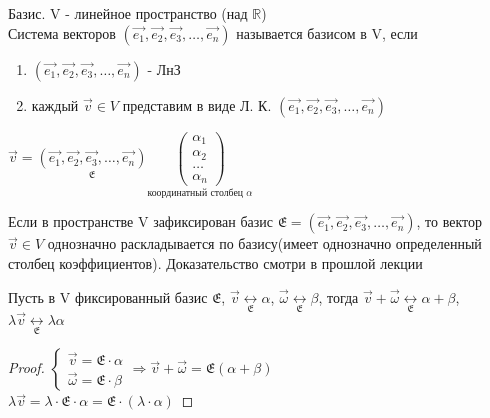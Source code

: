 	\begin{definition}
		Базис. V - линейное пространство (над $\mathbb{R}$) \\
		Система векторов \((\vec{e_1}, \vec{e_2}, \vec{e_3},\ldots, \vec{e_n})\) называется базисом в V, если 
		\begin{enumerate}
			\item \((\vec{e_1}, \vec{e_2}, \vec{e_3},\ldots, \vec{e_n})\) - ЛнЗ
			\item каждый $\vec{v}\in V$ представим в виде Л. К. \((\vec{e_1}, \vec{e_2}, \vec{e_3},\ldots, \vec{e_n})\)
		\end{enumerate}
		\begin{note}
			$\vec{v} = \underset{\mathfrak{E}}{(\vec{e_1}, \vec{e_2}, \vec{e_3},\ldots, \vec{e_n})}\underset{\text{координатный столбец } \alpha}{\begin{pmatrix}
					\alpha_1 \\ \alpha_2 \\ \ldots \\\alpha_n
			\end{pmatrix}} $
		\end{note}
	\end{definition}
	\begin{proposition}
		Если в пространстве V зафиксирован базис $\mathfrak{E} =(\vec{e_1}, \vec{e_2}, \vec{e_3},\ldots, \vec{e_n})$, то вектор $\vec{v}\in V$ однозначно раскладывается по базису(имеет однозначно определенный столбец коэффициентов). Доказательство смотри в прошлой лекции
	\end{proposition}
	\begin{proposition}
		Пусть в V фиксированный базис $\mathfrak{E}$, $\vec{v}\underset{\mathfrak{E}}{\longleftrightarrow}\alpha$, $\vec{\omega}\underset{\mathfrak{E}}{\longleftrightarrow}\beta$, тогда $\vec{v}+\vec{\omega}\underset{\mathfrak{E}}{\longleftrightarrow}\alpha+\beta$, \(\lambda \vec{v}\underset{\mathfrak{E}}{\longleftrightarrow}\lambda \alpha\)
	\end{proposition}
	\begin{proof}
		$\left\{\begin{gathered}
			\vec{v} = \mathfrak{E}\cdot\alpha \\
			\vec{\omega} = \mathfrak{E}\cdot \beta
		\end{gathered}\right. \Longrightarrow \vec{v}+\vec{\omega} = \mathfrak{E}(\alpha+\beta)$ \\
		$\lambda \vec{v} = \lambda\cdot\mathfrak{E}\cdot\alpha = \mathfrak{E}\cdot(\lambda\cdot\alpha)$
	\end{proof}
